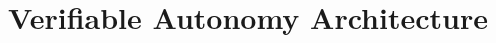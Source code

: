 \documentclass{style/nsf}
\begin{document}

\title{Verifiable Autonomy Architecture}
%





\newpage{}
\renewcommand\refname{References Cited}


\appendix

\newpage{}


\newpage{}


\newpage{}


%

%


%
\end{document}
